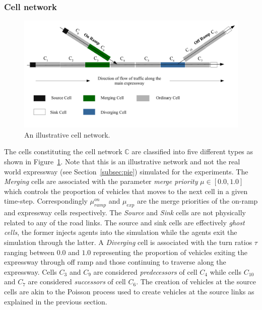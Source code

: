 \documentclass{wscpaperproc}
\theoremstyle{wsc}
\begin{document}
\subsubsection{Cell network}
\begin{figure}[htb]
    \centering
    \includegraphics[scale=0.55]{images/cellNetwork.pdf}

    \caption{An illustrative cell network.}
    \label{fig:cell-network}
  \end{figure}

The cells constituting the cell network $\mathbb{C}$ are classified into five different types as shown in Figure~\ref{fig:cell-network}. Note that this is an illustrative network and not the real world expressway (see Section~\ref{subsec:pie}) simulated for the experiments. The {\it Merging} cells are associated with the parameter {\it merge priority} $\mu\in [0.0,1.0]$ which controls the proportion of vehicles that moves to the next cell in a given time-step. Correspondingly $\mu^{on}_{ramp}$ and $\mu_{exp}$ are the merge priorities of the on-ramp and expressway cells respectively. The {\it Source} and {\it Sink} cells are not physically related to any of the road links. The source and sink cells are effectively {\it ghost cells}, the former injects agents into the simulation while the agents exit the simulation through the latter. A {\it Diverging} cell is associated with the turn ratios $\tau$ ranging between $0.0$ and $1.0$ representing the proportion of vehicles exiting the expressway through off ramp and those continuing to traverse along the expressway. Cells $C_3$ and $C_9$ are considered {\it predecessors} of cell $C_4$ while cells $C_{10}$ and $C_7$ are considered {\it successors} of cell $C_6$. The creation of vehicles at the source cells are akin to the Poisson process used to create vehicles at the source links as explained in the previous section.
\end{document}
